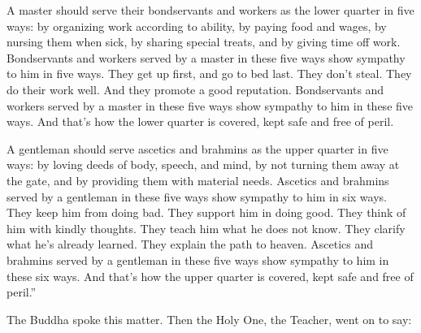\documentclass[12pt,openany]{book}%
\begin{document}
A master should serve their bondservants and workers as the lower quarter in five ways: by organizing work according to ability, by paying food and wages, by nursing them when sick, by sharing special treats, and by giving time off work. Bondservants and workers served by a master in these five ways show sympathy to him in five ways. They get up first, and go to bed last. They don’t steal. They do their work well. And they promote a good reputation. Bondservants and workers served by a master in these five ways show sympathy to him in these five ways. And that’s how the lower quarter is covered, kept safe and free of peril. 

A gentleman should serve ascetics and brahmins as the upper quarter in five ways: by loving deeds of body, speech, and mind, by not turning them away at the gate, and by providing them with material needs. Ascetics and brahmins served by a gentleman in these five ways show sympathy to him in six ways. They keep him from doing bad. They support him in doing good. They think of him with kindly thoughts. They teach him what he does not know. They clarify what he’s already learned. They explain the path to heaven. Ascetics and brahmins served by a gentleman in these five ways show sympathy to him in these six ways. And that’s how the upper quarter is covered, kept safe and free of peril.” 

The Buddha spoke this matter. Then the Holy One, the Teacher, went on to say: 
\end{document}
